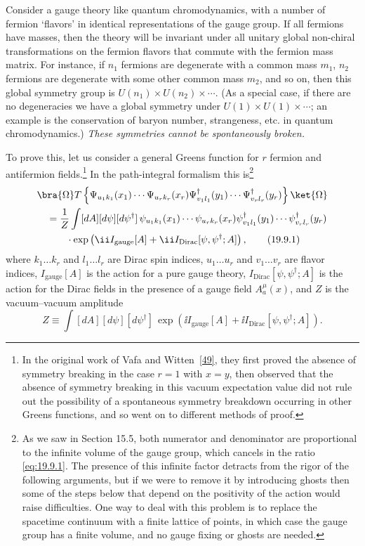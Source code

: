 Consider a gauge theory like quantum chromodynamics, with a number of fermion `flavors' in identical representations of the gauge group. If all fermions have masses, then the theory will be invariant under all unitary global non-chiral transformations on the fermion flavors that commute with the fermion mass matrix. For instance, if $n_1$ fermions are degenerate with a common mass $m_1$, $n_2$ fermions are degenerate with some other common mass $m_2$, and so on, then this global symmetry group is $U(n_1)\times U(n_2)\times\cdots$. (As a special case, if there are no degeneracies we have a global symmetry under $U(1)\times U(1)\times\cdots$; an example is the conservation of baryon number, strangeness, etc. in quantum chromodynamics.) \emph{These symmetries cannot be spontaneously broken.}

To prove this, let us consider a general Greens function for $r$ fermion and antifermion fields.\footnote{In the original work of Vafa and Witten~\hyperref[ch19-ref-49]{[49]}, they first proved the absence of symmetry breaking in the case $r=1$ with $x=y$, then observed that the absence of symmetry breaking in this vacuum expectation value did not rule out the possibility of a spontaneous symmetry breakdown occurring in other Greens functions, and so went on to different methods of proof.} In the path-integral formalism this is\footnote{As we saw in Section 15.5, both numerator and denominator are proportional to the infinite volume of the gauge group, which cancels in the ratio \eqref{eq:19.9.1}. The presence of this infinite factor detracts from the rigor of the following arguments, but if we were to remove it by introducing ghosts then some of the steps below that depend on the positivity of the action would raise difficulties. One way to deal with this problem is to replace the spacetime continuum with a finite lattice of points, in which case the gauge group has a finite volume, and no gauge fixing or ghosts are needed.}
\begin{align}
&\bra{\Omega}T\left\{
\Psi_{u_1k_1}(x_1)\cdots\Psi_{u_rk_r}(x_r)
\Psi^\dagger_{v_1l_1}(y_1)\cdots\Psi^\dagger_{v_rl_r}(y_r)
\right\}\ket{\Omega}
\notag\\
&\quad=\frac{1}{Z}\int[dA][d\psi][d\psi^\dagger]\,
\psi_{u_1k_1}(x_1)\cdots\psi_{u_rk_r}(x_r)
\psi^\dagger_{v_1l_1}(y_1)\cdots\psi^\dagger_{v_rl_r}(y_r)
\notag\\
&\qquad\quad{}\cdot
\exp\left(\ii I_{\mathrm{gauge}}[A]
+\ii I_{\mathrm{Dirac}}[\psi,\psi^\dagger;A]\right),
\tag{19.9.1}\label{eq:19.9.1}
\end{align}
where $k_1\ldots k_r$ and $l_1\ldots l_r$ are Dirac spin indices, $u_1\ldots u_r$ and $v_1\ldots v_r$ are flavor indices, $I_{\mathrm{gauge}}[A]$ is the action for a pure gauge theory, $I_{\mathrm{Dirac}}[\psi,\psi^\dagger;A]$ is the action for the Dirac fields in the presence of a gauge field $A^\mu_a(x)$, and $Z$ is the vacuum--vacuum amplitude
\begin{equation}
Z\equiv\int[dA][d\psi][d\psi^\dagger]\,
\exp\left(\ii I_{\mathrm{gauge}}[A]
+\ii I_{\mathrm{Dirac}}[\psi,\psi^\dagger;A]\right).
\tag{19.9.2}\label{eq:19.9.2}
\end{equation}

